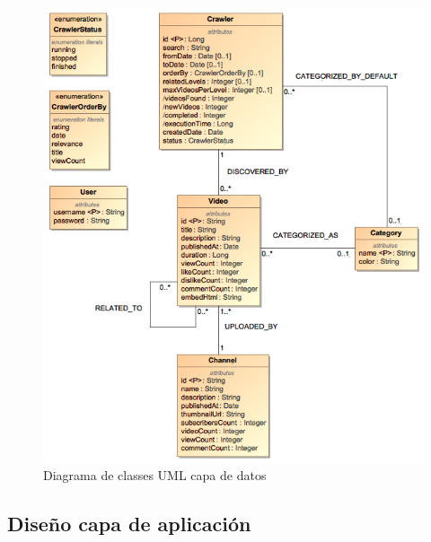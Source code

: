 \documentclass[11pt,a4paper]{article}
\begin{document}
\begin{figure}[H]
\centering
\includegraphics[scale=0.6]{diseno/DatabaseUML.png}
\caption{Diagrama de classes UML capa de datos}
\end{figure}

\medskip 

\subsection{Diseño capa de aplicación}
\end{document}
